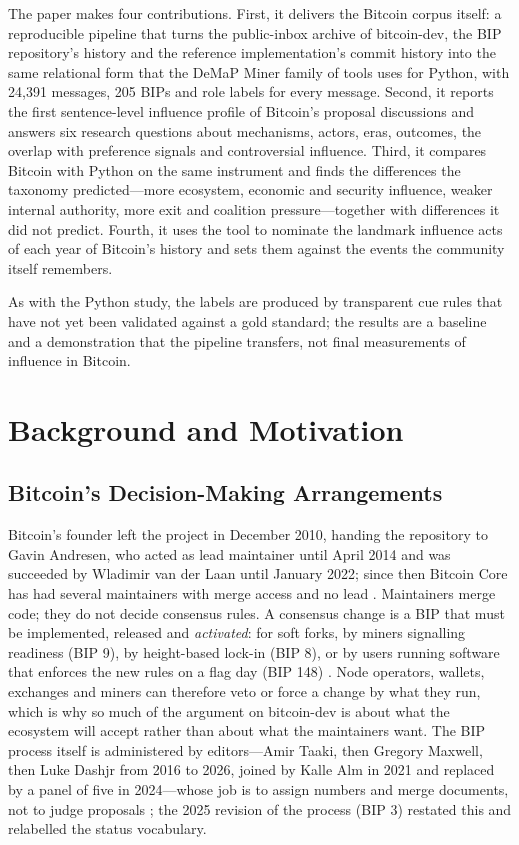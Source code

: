\documentclass[sigconf,screen]{acmart}
\begin{document}
The paper makes four contributions. First, it delivers the Bitcoin corpus itself: a reproducible pipeline that turns the public-inbox archive of bitcoin-dev, the BIP repository's history and the reference implementation's commit history into the same relational form that the DeMaP Miner family of tools uses for Python, with 24,391 messages, 205 BIPs and role labels for every message. Second, it reports the first sentence-level influence profile of Bitcoin's proposal discussions and answers six research questions about mechanisms, actors, eras, outcomes, the overlap with preference signals and controversial influence. Third, it compares Bitcoin with Python on the same instrument and finds the differences the taxonomy predicted---more ecosystem, economic and security influence, weaker internal authority, more exit and coalition pressure---together with differences it did not predict. Fourth, it uses the tool to nominate the landmark influence acts of each year of Bitcoin's history and sets them against the events the community itself remembers.

As with the Python study, the labels are produced by transparent cue rules that have not yet been validated against a gold standard; the results are a baseline and a demonstration that the pipeline transfers, not final measurements of influence in Bitcoin.

\section{Background and Motivation}
\label{sec:background}

\subsection{Bitcoin's Decision-Making Arrangements}

Bitcoin's founder left the project in December 2010, handing the repository to Gavin Andresen, who acted as lead maintainer until April 2014 and was succeeded by Wladimir van der Laan until January 2022; since then Bitcoin Core has had several maintainers with merge access and no lead \cite{bier2021}. Maintainers merge code; they do not decide consensus rules. A consensus change is a BIP that must be implemented, released and \emph{activated}: for soft forks, by miners signalling readiness (BIP 9), by height-based lock-in (BIP 8), or by users running software that enforces the new rules on a flag day (BIP 148) \cite{bip8, bip148}. Node operators, wallets, exchanges and miners can therefore veto or force a change by what they run, which is why so much of the argument on bitcoin-dev is about what the ecosystem will accept rather than about what the maintainers want. The BIP process itself is administered by editors---Amir Taaki, then Gregory Maxwell, then Luke Dashjr from 2016 to 2026, joined by Kalle Alm in 2021 and replaced by a panel of five in 2024---whose job is to assign numbers and merge documents, not to judge proposals \cite{bip2}; the 2025 revision of the process (BIP 3) restated this and relabelled the status vocabulary.
\end{document}
